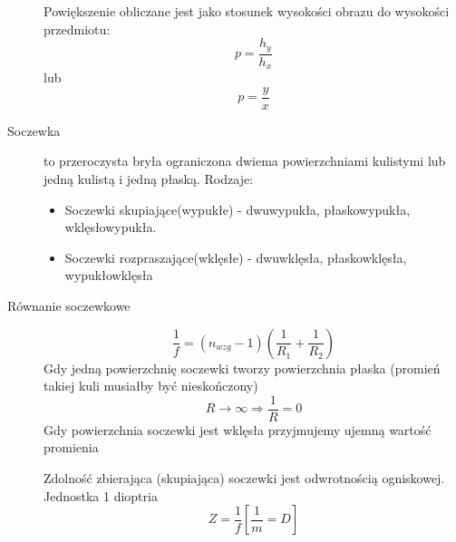 \documentclass[a4paper,11pt]{article}
\begin{document}
\begin{description}
  Powiększenie obliczane jest jako stosunek wysokości obrazu do wysokości przedmiotu:
  $$p=\frac{h_y}{h_x}$$
  lub 
  $$p=\frac{y}{x}$$
\item[Soczewka] to przeroczysta bryła ograniczona dwiema powierzchniami kulistymi lub jedną kulistą i jedną płaską. Rodzaje:
  \begin{itemize}
  \item Soczewki skupiające(wypukłe) - dwuwypukła, płaskowypukła, wklęsłowypukła. 
  \item Soczewki rozpraszające(wklęsłe) - dwuwklęsła, płaskowklęsła, wypukłowklęsła
  \end{itemize}
\item[Równanie soczewkowe]
  $$\frac{1}{f}=\left(n_{wzg}-1\right)\left(\frac{1}{R_1}+\frac{1}{R_2}\right)$$
  Gdy jedną powierzchnię soczewki tworzy powierzchnia płaska (promień takiej kuli musiałby być nieskończony)
  $$R\longrightarrow\infty\Rightarrow\frac{1}{R}=0$$
  Gdy powierzchnia soczewki jest wklęsła przyjmujemy ujemną wartość promienia

  Zdolność zbierająca (skupiająca) soczewki jest odwrotnością ogniskowej. Jednostka 1 dioptria
  $$Z=\frac{1}{f}\left[\frac{1}{m}=D\right]$$
\end{description}
\end{document}
